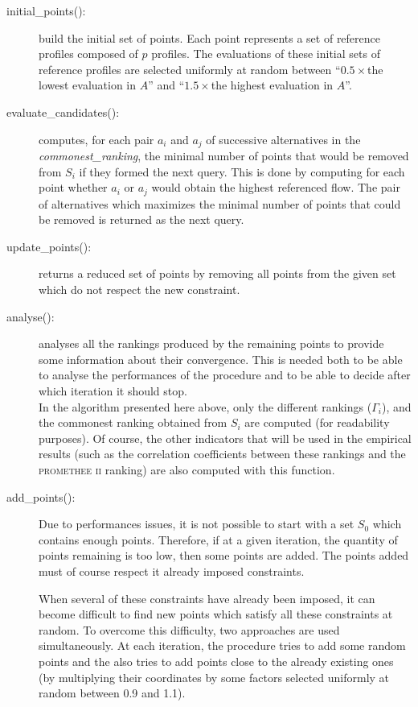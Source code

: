 \begin{description}
    \item[initial\_points():] build the initial set of points. Each point represents a set of reference profiles composed of $p$ profiles. The evaluations of these initial sets of reference profiles are selected uniformly at random between ``$0.5 \times$the lowest evaluation in $A$'' and ``$1.5 \times$the highest evaluation in $A$''.
    \item[evaluate\_candidates():] computes, for each pair $a_i$ and $a_j$ of successive alternatives in the \textit{commonest\_ranking}, the minimal number of points that would be removed from $S_i$ if they formed the next query.
        This is done by computing for each point whether $a_i$ or $a_j$ would obtain the highest referenced flow.
        The pair of alternatives which maximizes the minimal number of points that could be removed is returned as the next query.
    \item[update\_points():] returns a reduced set of points by removing all points from the given set which do not respect the new constraint.
    \item[analyse(): ] analyses all the rankings produced by the remaining points to provide some information about their convergence. This is needed both to be able to analyse the performances of the procedure and to be able to decide after which iteration it should stop. \\
        In the algorithm presented here above, only the different rankings ($\Gamma_i$), and the commonest ranking  obtained from $S_i$ are computed (for readability purposes). Of course, the other indicators that will be used in the empirical results (such as the correlation coefficients between these rankings and the \textsc{promethee ii} ranking) are also computed with this function.
    \item[add\_points():] Due to performances issues, it is not possible to start with a set $S_0$ which contains enough points. Therefore, if at a given iteration, the quantity of points remaining is too low, then some points are added. The points added must of course respect it already imposed constraints.

        When several of these constraints have already been imposed, it can become difficult to find new points which satisfy all these constraints at random. To overcome this difficulty, two approaches are used simultaneously. At each iteration, the procedure tries to add some random points and the also tries to add points close to the already existing ones (by multiplying their coordinates by some factors selected uniformly at random between 0.9 and 1.1).
\end{description}


